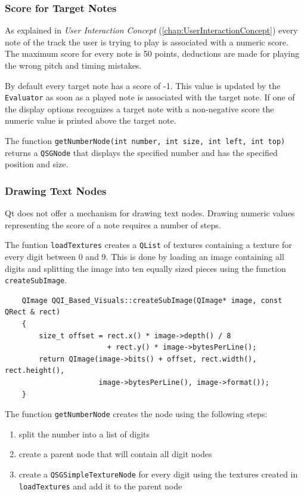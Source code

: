 \subsubsection{Score for Target Notes}
As explained in \textit{User Interaction Concept} (\ref{chap:UserInteractionConcept}) every note of the track the user is trying to play is associated with a numeric score. The maximum score for every note is 50 points, deductions are made for playing the wrong pitch and timing mistakes.

By default every target note has a score of -1. This value is updated by the {\tt Evaluator} as soon as a played note is associated with the target note. If one of the display options recognizes a target note with a non-negative score the numeric value is printed above the target note.

The function {\tt getNumberNode(int number, int size, int left, int top)} returns a {\tt QSGNode} that displays the specified number and has the specified position and size.

\subsubsection{Drawing Text Nodes}
Qt does not offer a mechanism for drawing text nodes. Drawing numeric values representing the score of a note requires a number of steps. 

The funtion {\tt loadTextures} creates a {\tt QList} of textures containing a texture for every digit between 0 and 9.
This is done by loading an image containing all digits and splitting the image into ten equally sized pieces using the function {\tt createSubImage}.

\begin{lstlisting}
	QImage QQI_Based_Visuals::createSubImage(QImage* image, const QRect & rect)
	{
	    size_t offset = rect.x() * image->depth() / 8
	                    + rect.y() * image->bytesPerLine();
	    return QImage(image->bits() + offset, rect.width(), rect.height(),
	                  image->bytesPerLine(), image->format());
	}
\end{lstlisting}

The function {\tt getNumberNode} creates the node using the following steps:

\begin{enumerate}
	\item{split the number into a list of digits}
	\item{create a parent node that will contain all digit nodes}
	\item{create a {\tt QSGSimpleTextureNode} for every digit using the textures created in {\tt loadTextures} and add it to the parent node}
\end{enumerate}

